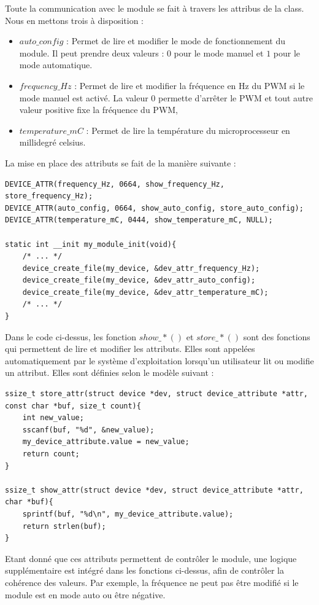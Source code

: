 \documentclass[
	a4paper, %
	10pt, %
]{CSUniSchoolLabReport}
\begin{document}
Toute la communication avec le module se fait à travers les attribus de la class. Nous en mettons trois à disposition :
\begin{itemize}
	\item $auto\_config$ : Permet de lire et modifier le mode de fonctionnement du module. Il peut prendre deux valeurs : $0$ pour le mode manuel et $1$ pour le mode automatique.
	\item $frequency\_Hz$ : Permet de lire et modifier la fréquence en Hz du PWM si le mode manuel est activé. La valeur $0$ permette d'arrêter le PWM et tout autre valeur positive fixe la fréquence du PWM, 
	\item $temperature\_mC$ : Permet de lire la température du microprocesseur en millidegré celsius.
\end{itemize}

La mise en place des attributs se fait de la manière suivante :
\begin{lstlisting}[style=CStyle]
DEVICE_ATTR(frequency_Hz, 0664, show_frequency_Hz, store_frequency_Hz);
DEVICE_ATTR(auto_config, 0664, show_auto_config, store_auto_config);
DEVICE_ATTR(temperature_mC, 0444, show_temperature_mC, NULL);

static int __init my_module_init(void){
	/* ... */
	device_create_file(my_device, &dev_attr_frequency_Hz);
	device_create_file(my_device, &dev_attr_auto_config);
	device_create_file(my_device, &dev_attr_temperature_mC);
	/* ... */
}
\end{lstlisting}

Dans le code ci-dessus, les fonction $show\_*()$ et $store\_*()$ sont des fonctions qui permettent de lire et modifier les attributs. Elles sont appelées automatiquement par le système d'exploitation lorsqu'un utilisateur lit ou modifie un attribut. Elles sont définies selon le modèle suivant :

\begin{lstlisting}[style=CStyle]
ssize_t store_attr(struct device *dev, struct device_attribute *attr, const char *buf, size_t count){
	int new_value;
	sscanf(buf, "%d", &new_value);
	my_device_attribute.value = new_value;
	return count;
}

ssize_t show_attr(struct device *dev, struct device_attribute *attr, char *buf){
	sprintf(buf, "%d\n", my_device_attribute.value);
	return strlen(buf);
}
\end{lstlisting}

Etant donné que ces attributs permettent de contrôler le module, une logique supplémentaire est intégré dans les fonctions ci-dessus, afin de contrôler la cohérence des valeurs. Par exemple, la fréquence ne peut pas être modifié si le module est en mode auto ou être négative. \\
\end{document}
